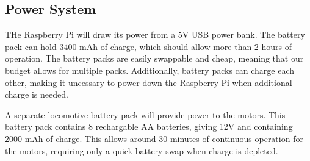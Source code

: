 
\subsection{Power System}
\label{sec:hardware_power}

THe Raspberry Pi will draw its power from a 5V USB power bank. The battery pack can hold 3400 mAh of charge, which should allow more than 2 hours of operation. The battery packs are easily swappable and cheap, meaning that our budget allows for multiple packs. Additionally, battery packs can charge each other, making it uncessary to power down the Raspberry Pi when additional charge is needed.

A separate locomotive battery pack will provide power to the motors. This battery pack contains 8 rechargable AA batteries, giving 12V and containing 2000 mAh of charge. This allows around 30 minutes of continuous operation for the motors, requiring only a quick battery swap when charge is depleted.